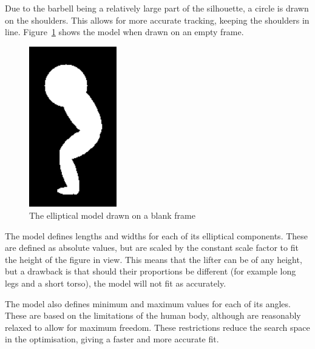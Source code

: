 Due to the barbell being a relatively large part of the silhouette, a circle is drawn on the shoulders. This allows for more accurate tracking, keeping the shoulders in line. Figure~\ref{fig:modeldrawn} shows the model when drawn on an empty frame.

\begin{figure}[H]
    \centering
	\includegraphics[height=7cm]{algorithm/images/model_drawn}
\caption{The elliptical model drawn on a blank frame}
\label{fig:modeldrawn}
\end{figure}

The model defines lengths and widths for each of its elliptical components. These are defined as absolute values, but are scaled by the constant scale factor to fit the height of the figure in view. This means that the lifter can be of any height, but a drawback is that should their proportions be different (for example long legs and a short torso), the model will not fit as accurately.

The model also defines minimum and maximum values for each of its angles. These are based on the limitations of the human body, although are reasonably relaxed to allow for maximum freedom. These restrictions reduce the search space in the optimisation, giving a faster and more accurate fit.

